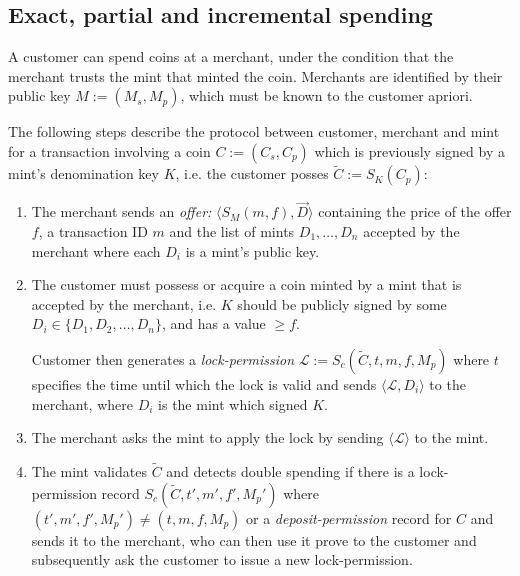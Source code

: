 \documentclass{llncs}
\begin{document}
\subsection{Exact, partial and incremental spending}

A customer can spend coins at a merchant, under the condition that the
merchant trusts the mint that minted the coin.  Merchants are
identified by their public key $M := (M_s, M_p)$, which must be known
to the customer apriori.

The following steps describe the protocol between customer, merchant and mint
for a transaction involving a coin $C := (C_s, C_p)$ which is previously signed
by a mint's denomination key $K$, i.e. the customer posses
$\widetilde{C} := S_K(C_p)$:

\begin{enumerate}
\item\label{offer} The merchant sends an \emph{offer:} $\langle S_M(m, f),
  \vec{D} \rangle$ containing the price of the offer $f$, a transaction
  ID $m$ and the list of mints $D_1, \ldots, D_n$ accepted by the merchant
  where each $D_i$ is a mint's public key.
\item\label{lock} The customer must possess or acquire a coin minted by a mint that is
  accepted by the merchant, i.e. $K$ should be publicly signed by some $D_i
  \in \{D_1, D_2, \ldots, D_n\}$, and has a value $\geq f$.

  Customer then generates a \emph{lock-permission} $\mathcal{L} :=
  S_c(\widetilde{C}, t, m, f, M_p)$ where $t$ specifies the time until which the
  lock is valid and sends $\langle \mathcal{L}, D_i\rangle$ to the merchant,
  where $D_i$ is the mint which signed $K$.
\item The merchant asks the mint to apply the lock by sending $\langle
  \mathcal{L} \rangle$ to the mint.
\item The mint validates $\widetilde{C}$ and detects double spending if there is
  a lock-permission record $S_c(\widetilde{C}, t', m', f', M_p')$ where $(t',
  m', f', M_p') \neq (t, m, f, M_p)$ or a \emph{deposit-permission} record for
  $C$ and sends it to the merchant, who can then use it prove to the customer
  and subsequently ask the customer to issue a new lock-permission.


\end{enumerate}
\end{document}
